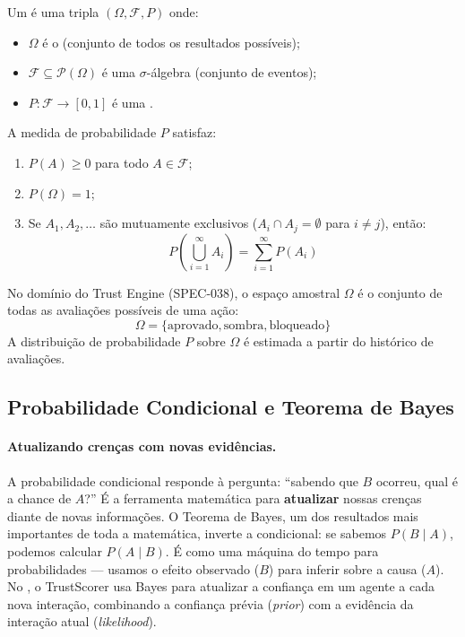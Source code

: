 \begin{definicao}
    Um  é uma tripla $(\Omega, \mathcal{F},
    P)$ onde:
    \begin{itemize}
        \item $\Omega$ é o  (conjunto de todos os
              resultados possíveis);
        \item $\mathcal{F} \subseteq \mathcal{P}(\Omega)$ é uma
              $\sigma$-álgebra (conjunto de eventos);
        \item $P: \mathcal{F} \to [0,1]$ é uma .
    \end{itemize}
\end{definicao}

\begin{definicao}
    A medida de probabilidade $P$ satisfaz:
    \begin{enumerate}
        \item $P(A) \geq 0$ para todo $A \in \mathcal{F}$;
        \item $P(\Omega) = 1$;
        \item Se $A_1, A_2, \ldots$ são mutuamente exclusivos
              ($A_i \cap A_j = \emptyset$ para $i \neq j$), então:
              \[
              P\left(\bigcup_{i=1}^{\infty} A_i\right) =
              \sum_{i=1}^{\infty} P(A_i)
              \]
    \end{enumerate}
\end{definicao}

\begin{exemplo}
    No domínio do Trust Engine (SPEC-038), o espaço amostral $\Omega$ é o
    conjunto de todas as avaliações possíveis de uma ação:
    \[
    \Omega = \{\text{aprovado}, \text{sombra}, \text{bloqueado}\}
    \]
    A distribuição de probabilidade $P$ sobre $\Omega$ é estimada a partir
    do histórico de avaliações.
\end{exemplo}

\subsection{Probabilidade Condicional e Teorema de Bayes}

\paragraph{Atualizando crenças com novas evidências.} A probabilidade
condicional responde à pergunta: ``sabendo que $B$ ocorreu, qual é a chance
de $A$?'' É a ferramenta matemática para \textbf{atualizar} nossas crenças
diante de novas informações. O Teorema de Bayes, um dos resultados mais
importantes de toda a matemática, inverte a condicional: se sabemos
$P(B \mid A)$, podemos calcular $P(A \mid B)$. É como uma máquina do tempo
para probabilidades --- usamos o efeito observado ($B$) para inferir sobre
a causa ($A$). No \opencodeeco{}, o TrustScorer usa Bayes para atualizar a
confiança em um agente a cada nova interação, combinando a confiança prévia
(\textit{prior}) com a evidência da interação atual (\textit{likelihood}).

